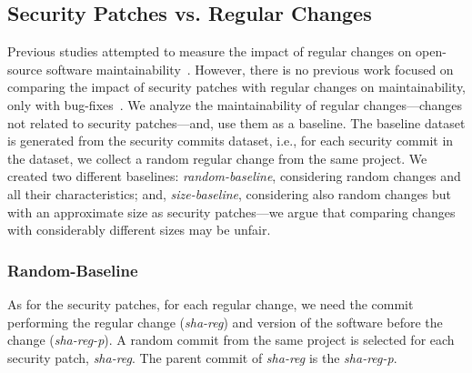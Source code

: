 \documentclass[smallextended]{svjour3}       %
\begin{document}
%
\subsection{Security Patches vs. Regular Changes}
%
Previous studies attempted to measure the impact of regular changes 
on open-source software maintainability~\cite{HEGEDUS2018313}. 
However, there is no previous work focused on comparing the impact 
of security patches with regular changes on maintainability, only
with bug-fixes~\cite{10.1145/3133956.3134072}.
We analyze the maintainability of regular changes---changes not 
related to security patches---and, use them as a baseline.
The baseline dataset is generated from the security commits dataset, i.e.,
for each security commit in the dataset, we collect a random regular
change from the same project. We created two different baselines: 
\textit{random-baseline},
considering random changes and all their characteristics; and,
\textit{size-baseline}, considering also random changes
but with an approximate size as security patches---we argue 
that comparing changes with considerably different sizes may be unfair.

\subsubsection{Random-Baseline} 

As for the security patches, for each regular change, we  
need the commit performing the regular change (\emph{sha-reg}) and version of the software before the change (\emph{sha-reg-p}). A 
random commit from the same project is selected for each security patch, \emph{sha-reg}. The parent commit
of \emph{sha-reg} is the \emph{sha-reg-p}.
\end{document}
